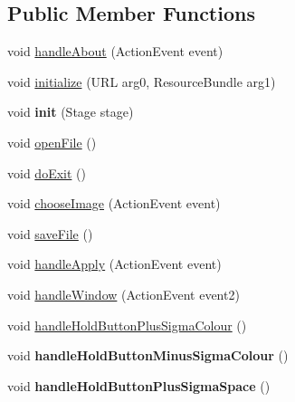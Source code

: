 \subsection*{Public Member Functions}
\begin{DoxyCompactItemize}
\item 
void \mbox{\hyperlink{classapplication_1_1_f_x_controller_ac94b73f4dcdad256b2e4d5314dc42d2b}{handle\+About}} (Action\+Event event)
\item 
void \mbox{\hyperlink{classapplication_1_1_f_x_controller_a1aa99fad0d86d829a852e17712a5029a}{initialize}} (U\+RL arg0, Resource\+Bundle arg1)
\item 
\mbox{\label{classapplication_1_1_f_x_controller_a4d01b51192bec48b553421fac2adce0e}} 
void {\bfseries init} (Stage stage)
\item 
void \mbox{\hyperlink{classapplication_1_1_f_x_controller_a46a8c8b397699390607ad6bff526d386}{open\+File}} ()
\item 
void \mbox{\hyperlink{classapplication_1_1_f_x_controller_ae830da008c5d032e83dd11b075f4e9bf}{do\+Exit}} ()
\item 
void \mbox{\hyperlink{classapplication_1_1_f_x_controller_a723312c2219263bdfadd98d86186a365}{choose\+Image}} (Action\+Event event)
\item 
void \mbox{\hyperlink{classapplication_1_1_f_x_controller_af9d560a93b56e46e95d267e0e4b205a2}{save\+File}} ()
\item 
void \mbox{\hyperlink{classapplication_1_1_f_x_controller_ab9a4a2be0061da0337d29ace0a3d738e}{handle\+Apply}} (Action\+Event event)
\item 
void \mbox{\hyperlink{classapplication_1_1_f_x_controller_a4ba7818448465dabfafce77571565fb7}{handle\+Window}} (Action\+Event event2)
\item 
void \mbox{\hyperlink{classapplication_1_1_f_x_controller_a43fca4a5dc168068c3e978672324fb31}{handle\+Hold\+Button\+Plus\+Sigma\+Colour}} ()
\item 
\mbox{\label{classapplication_1_1_f_x_controller_a9b04d2f343061c52297827dbd74d552c}} 
void {\bfseries handle\+Hold\+Button\+Minus\+Sigma\+Colour} ()
\item 
\mbox{\label{classapplication_1_1_f_x_controller_aafdb5090900c0787114bd3bf8a244c00}} 
void {\bfseries handle\+Hold\+Button\+Plus\+Sigma\+Space} ()

\end{DoxyCompactItemize}
